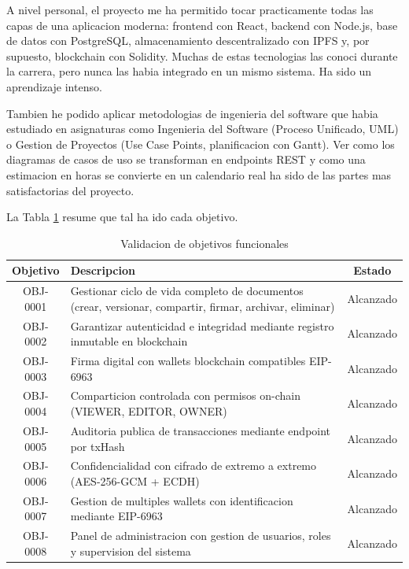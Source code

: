 \documentclass[11pt, a4paper]{article}
\begin{document}
A nivel personal, el proyecto me ha permitido tocar practicamente todas las capas de una aplicacion moderna: frontend con React, backend con Node.js, base de datos con PostgreSQL, almacenamiento descentralizado con IPFS y, por supuesto, blockchain con Solidity. Muchas de estas tecnologias las conoci durante la carrera, pero nunca las habia integrado en un mismo sistema. Ha sido un aprendizaje intenso.

Tambien he podido aplicar metodologias de ingenieria del software que habia estudiado en asignaturas como Ingenieria del Software (Proceso Unificado, UML) o Gestion de Proyectos (Use Case Points, planificacion con Gantt). Ver como los diagramas de casos de uso se transforman en endpoints REST y como una estimacion en horas se convierte en un calendario real ha sido de las partes mas satisfactorias del proyecto.

La Tabla \ref{tab:validacion-obj} resume que tal ha ido cada objetivo.

\begin{table}[H]
\centering
\renewcommand{\arraystretch}{1.4}
\small
\begin{tabular}{|c|p{8cm}|c|}
\hline
\textbf{Objetivo} & \textbf{Descripcion} & \textbf{Estado} \\
\hline
OBJ-0001 & Gestionar ciclo de vida completo de documentos (crear, versionar, compartir, firmar, archivar, eliminar) & Alcanzado \\
\hline
OBJ-0002 & Garantizar autenticidad e integridad mediante registro inmutable en blockchain & Alcanzado \\
\hline
OBJ-0003 & Firma digital con wallets blockchain compatibles EIP-6963 & Alcanzado \\
\hline
OBJ-0004 & Comparticion controlada con permisos on-chain (VIEWER, EDITOR, OWNER) & Alcanzado \\
\hline
OBJ-0005 & Auditoria publica de transacciones mediante endpoint por txHash & Alcanzado \\
\hline
OBJ-0006 & Confidencialidad con cifrado de extremo a extremo (AES-256-GCM + ECDH) & Alcanzado \\
\hline
OBJ-0007 & Gestion de multiples wallets con identificacion mediante EIP-6963 & Alcanzado \\
\hline
OBJ-0008 & Panel de administracion con gestion de usuarios, roles y supervision del sistema & Alcanzado \\
\hline
\end{tabular}
\caption{Validacion de objetivos funcionales}
\label{tab:validacion-obj}
\end{table}
\end{document}

